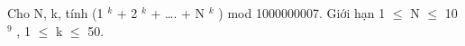 Cho N, k, tính (1 $^ k $ + 2 $^ k $ + …. + N $^ k $ ) mod 1000000007. Giới hạn 1  $\le$  N  $\le$  10 $^ 9 $ , 1  $\le$  k  $\le$  50.
